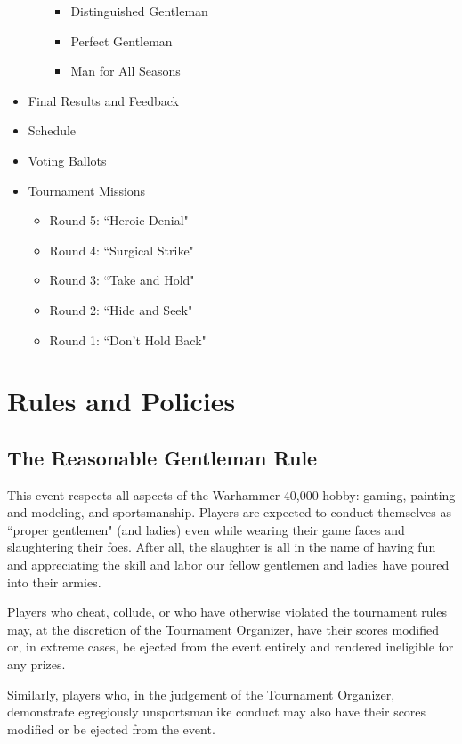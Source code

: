 \documentclass[10pt,titlepage]{article}
\begin{document}
\begin{itemize}
\begin{itemize}
\begin{itemize}
    \item Distinguished Gentleman
    \item Perfect Gentleman
    \item Man for All Seasons
    \end{itemize}
  \end{itemize}
\item Final Results and Feedback
\item Schedule
\item Voting Ballots
\item Tournament Missions
  \begin{itemize}
  \item Round 5: ``Heroic Denial"
  \item Round 4: ``Surgical Strike"
  \item Round 3: ``Take and Hold"
  \item Round 2: ``Hide and Seek"
  \item Round 1: ``Don't Hold Back"
  \end{itemize}
\end{itemize}

\newpage

\section*{Rules and Policies}

\subsection*{The Reasonable Gentleman Rule}

This event respects all aspects of the Warhammer 40,000 hobby: gaming, painting and modeling, and sportsmanship. Players are expected to conduct themselves as ``proper gentlemen" (and ladies) even while wearing their game faces and slaughtering their foes. After all, the slaughter is all in the name of having fun and appreciating the skill and labor our fellow gentlemen and ladies have poured into their armies.

Players who cheat, collude, or who have otherwise violated the tournament rules may, at the discretion of the Tournament Organizer, have their scores modified or, in extreme cases, be ejected from the event entirely and rendered ineligible for any prizes.

Similarly, players who, in the judgement of the Tournament Organizer, demonstrate egregiously unsportsmanlike conduct may also have their scores modified or be ejected from the event.
\end{document}
